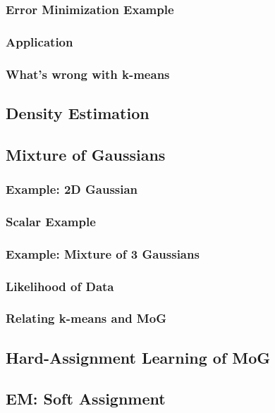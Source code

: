 \subsubsection{Error Minimization Example}

\subsubsection{Application}

\subsubsection{What's wrong with k-means}

\subsection{Density Estimation}
\subsection{Mixture of Gaussians}

\subsubsection{Example: 2D Gaussian}

\subsubsection{Scalar Example}

\subsubsection{Example: Mixture of 3 Gaussians}

\subsubsection{Likelihood of Data}

\subsubsection{Relating k-means and MoG}

\subsection{Hard-Assignment Learning of MoG}
\subsection{EM: Soft Assignment}